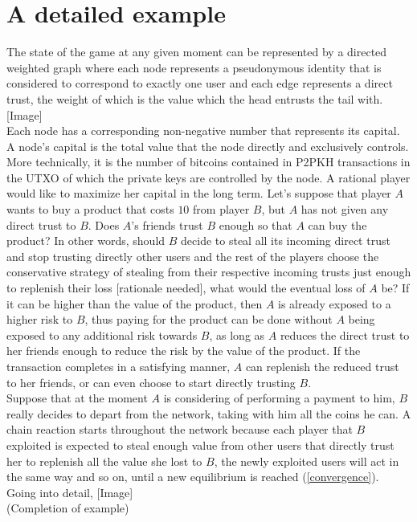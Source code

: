 \documentclass[11pt]{llncs}
\begin{document}
     
  \section{A detailed example}
     The state of the game at any given moment can be represented by a directed weighted graph where each node represents a
     pseudonymous identity that is considered to correspond to exactly one user and each edge represents a direct trust, the
     weight of which is the value which the head entrusts the tail with. [Image] \\
     Each node has a corresponding non-negative number that represents its capital. A node's capital is the total value that
     the node directly and exclusively controls. More technically, it is the number of bitcoins contained in P2PKH
     transactions in the UTXO of which the private keys are controlled by the node. A rational player would like to maximize
     her capital in the long term. Let's suppose that player $A$ wants to buy a product that costs $10$ from player $B$, but
     $A$ has not given any direct trust to $B$. Does $A$'s friends trust $B$ enough so that $A$ can buy the product? In other
     words, should $B$ decide to steal all its incoming direct trust and stop trusting directly other users and the rest of
     the players choose the conservative strategy of stealing from their respective incoming trusts just enough to replenish
     their loss [rationale needed], what would the eventual loss of $A$ be? If it can be higher than the value of the
     product, then $A$ is already exposed to a higher risk to $B$, thus paying for the product can be done without $A$ being
     exposed to any additional risk towards $B$, as long as $A$ reduces the direct trust to her friends enough to reduce the
     risk by the value of the product. If the transaction completes in a satisfying manner, $A$ can replenish the reduced
     trust to her friends, or can even choose to start directly trusting $B$. \\
     Suppose that at the moment $A$ is considering of performing a payment to him, $B$ really decides to depart from the
     network, taking with him all the coins he can. A chain reaction starts throughout the network because each player that
     $B$ exploited is expected to steal enough value from other users that directly trust her to replenish all the value she
     lost to $B$, the newly exploited users will act in the same way and so on, until a new equilibrium is reached
     (\ref{convergence}). Going into detail, [Image] \\
     (Completion of example)
\end{document}
